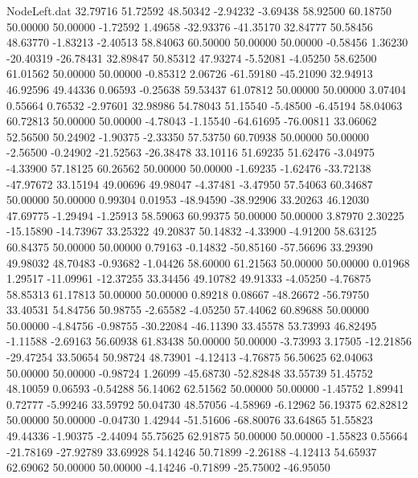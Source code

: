 \begin{filecontents}{NodeLeft.dat}
  32.79716   51.72592   48.50342    -2.94232   -3.69438   58.92500   60.18750   50.00000   50.00000   -1.72592    1.49658  -32.93376  -41.35170
  32.84777   50.58456   48.63770    -1.83213   -2.40513   58.84063   60.50000   50.00000   50.00000   -0.58456    1.36230  -20.40319  -26.78431
  32.89847   50.85312   47.93274    -5.52081   -4.05250   58.62500   61.01562   50.00000   50.00000   -0.85312    2.06726  -61.59180  -45.21090
  32.94913   46.92596   49.44336     0.06593   -0.25638   59.53437   61.07812   50.00000   50.00000    3.07404    0.55664    0.76532   -2.97601
  32.98986   54.78043   51.15540    -5.48500   -6.45194   58.04063   60.72813   50.00000   50.00000   -4.78043   -1.15540  -64.61695  -76.00811
  33.06062   52.56500   50.24902    -1.90375   -2.33350   57.53750   60.70938   50.00000   50.00000   -2.56500   -0.24902  -21.52563  -26.38478
  33.10116   51.69235   51.62476    -3.04975   -4.33900   57.18125   60.26562   50.00000   50.00000   -1.69235   -1.62476  -33.72138  -47.97672
  33.15194   49.00696   49.98047    -4.37481   -3.47950   57.54063   60.34687   50.00000   50.00000    0.99304    0.01953  -48.94590  -38.92906
  33.20263   46.12030   47.69775    -1.29494   -1.25913   58.59063   60.99375   50.00000   50.00000    3.87970    2.30225  -15.15890  -14.73967
  33.25322   49.20837   50.14832    -4.33900   -4.91200   58.63125   60.84375   50.00000   50.00000    0.79163   -0.14832  -50.85160  -57.56696
  33.29390   49.98032   48.70483    -0.93682   -1.04426   58.60000   61.21563   50.00000   50.00000    0.01968    1.29517  -11.09961  -12.37255
  33.34456   49.10782   49.91333    -4.05250   -4.76875   58.85313   61.17813   50.00000   50.00000    0.89218    0.08667  -48.26672  -56.79750
  33.40531   54.84756   50.98755    -2.65582   -4.05250   57.44062   60.89688   50.00000   50.00000   -4.84756   -0.98755  -30.22084  -46.11390
  33.45578   53.73993   46.82495    -1.11588   -2.69163   56.60938   61.83438   50.00000   50.00000   -3.73993    3.17505  -12.21856  -29.47254
  33.50654   50.98724   48.73901    -4.12413   -4.76875   56.50625   62.04063   50.00000   50.00000   -0.98724    1.26099  -45.68730  -52.82848
  33.55739   51.45752   48.10059     0.06593   -0.54288   56.14062   62.51562   50.00000   50.00000   -1.45752    1.89941    0.72777   -5.99246
  33.59792   50.04730   48.57056    -4.58969   -6.12962   56.19375   62.82812   50.00000   50.00000   -0.04730    1.42944  -51.51606  -68.80076
  33.64865   51.55823   49.44336    -1.90375   -2.44094   55.75625   62.91875   50.00000   50.00000   -1.55823    0.55664  -21.78169  -27.92789
  33.69928   54.14246   50.71899    -2.26188   -4.12413   54.65937   62.69062   50.00000   50.00000   -4.14246   -0.71899  -25.75002  -46.95050

\end{filecontents}
